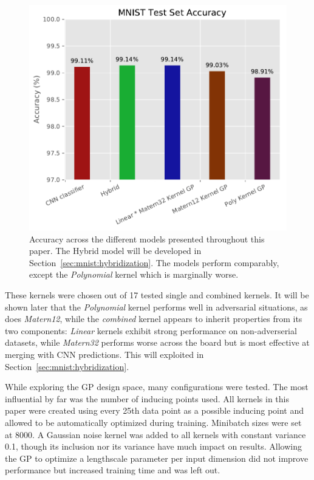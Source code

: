 \documentclass{article}
\begin{document}
\begin{figure}[hbt]
\centering
\includegraphics[width=\hsize]{figures/mnist/accuracies.pdf}
\caption{Accuracy across the different models presented throughout this paper. The Hybrid model will be developed in Section~\ref{sec:mnist:hybridization}. The models perform comparably, except the \textit{Polynomial} kernel which is marginally worse.}
\label{fig:model_accuracies}
\end{figure}


These kernels were chosen out of 17 tested single and combined kernels. It will be shown later that the \textit{Polynomial} kernel performs well in adversarial situations, as does \textit{Matern12}, while the \textit{combined} kernel appears to inherit properties from its two components: \textit{Linear} kernels exhibit strong performance on non-adverserial datasets, while \textit{Matern32} performs worse across the board but is most effective at merging with CNN predictions. This will exploited in  Section~\ref{sec:mnist:hybridization}.

While exploring the GP design space, many configurations were tested. The most influential by far was the number of inducing points used. All kernels in this paper were created using every 25th data point as a possible inducing point and allowed to be automatically optimized during training. Minibatch sizes were set at 8000. A Gaussian noise kernel was added to all kernels with constant variance 0.1, though its inclusion nor its variance have much impact on results. Allowing the GP to optimize a lengthscale parameter per input dimension did not improve performance but increased training time and was left out.
\end{document}
